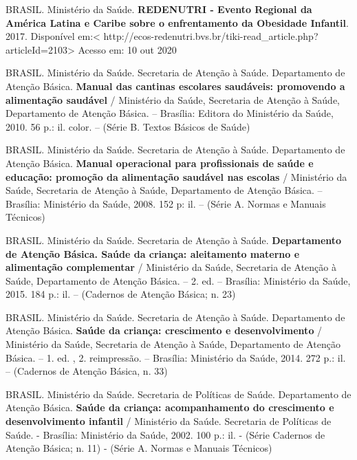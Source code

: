 \noindent BRASIL. Ministério da Saúde. \textbf{REDENUTRI - Evento Regional da América Latina e Caribe sobre o enfrentamento da Obesidade Infantil}. 2017. Disponível em:< http://ecos-redenutri.bvs.br/tiki-read\_article.php?articleId=2103> Acesso em: 10 out 2020

\bigbreak

\noindent BRASIL. Ministério da Saúde. Secretaria de Atenção à Saúde. Departamento de Atenção Básica. \textbf{Manual das cantinas escolares saudáveis: promovendo a alimentação saudável} / Ministério da Saúde, Secretaria de Atenção à Saúde, Departamento de Atenção Básica. – Brasília: Editora do Ministério da Saúde, 2010. 56 p.: il. color. – (Série B. Textos Básicos de Saúde)

\bigbreak

\noindent BRASIL. Ministério da Saúde. Secretaria de Atenção à Saúde. Departamento de Atenção Básica. \textbf{Manual operacional para profissionais de saúde e educação: promoção da alimentação saudável nas escolas} / Ministério da Saúde, Secretaria de Atenção à Saúde, Departamento de Atenção Básica. – Brasília: Ministério da Saúde, 2008. 152 p: il. – (Série A. Normas e Manuais Técnicos)

\bigbreak

\noindent BRASIL. Ministério da Saúde. Secretaria de Atenção à Saúde. \textbf{Departamento de Atenção Básica. Saúde da criança: aleitamento materno e alimentação complementar} / Ministério da Saúde, Secretaria de Atenção à Saúde, Departamento de Atenção Básica. – 2. ed. – Brasília: Ministério da Saúde, 2015. 184 p.: il. – (Cadernos de Atenção Básica; n. 23)

\bigbreak

\noindent BRASIL. Ministério da Saúde. Secretaria de Atenção à Saúde. Departamento de Atenção Básica. \textbf{Saúde da criança: crescimento e desenvolvimento} / Ministério da Saúde, Secretaria de Atenção à Saúde, Departamento de Atenção Básica. – 1. ed. , 2. reimpressão. – Brasília: Ministério da Saúde, 2014. 272 p.: il. – (Cadernos de Atenção Básica, n. 33)

\bigbreak

\noindent BRASIL. Ministério da Saúde. Secretaria de Políticas de Saúde. Departamento de Atenção Básica. \textbf{Saúde da criança: acompanhamento do crescimento e desenvolvimento infantil} / Ministério da Saúde. Secretaria de Políticas de Saúde. - Brasília: Ministério da Saúde, 2002. 100 p.: il. - (Série Cadernos de Atenção Básica; n. 11) - (Série A. Normas e Manuais Técnicos)
\bigbreak

